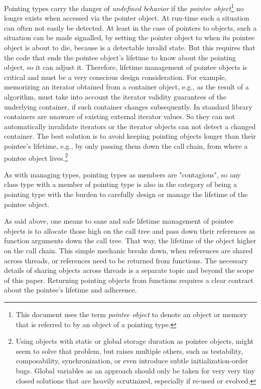 \documentclass[ebook,11pt,article]{memoir}
\begin{document}
Pointing types carry the danger of \emph{undefined behavior} if the \emph{pointee object}\footnote{This document uses the term \emph{pointee object} to denote an object or memory that is referred to by an object of a pointing type.} no longer exists when accessed via the pointer object. At run-time such a situation can often not easily be detected. At least in the case of pointers to objects, such a situation can be made signalled, by setting the pointer object to  when its pointee object is about to die, because  is a detectable invalid state. But this requires that the code that ends the pointee object's lifetime to know about the pointing object, so it can adjust it. Therefore, lifetime management of pointee objects is critical and must be a very conscious design consideration. For example, memorizing an iterator obtained from a container object, e.g., as the result of a  algorithm, must take into account the iterator validity guarantees of the underlying container, if such container changes subsequently. In \Cpp{} standard library containers are unaware of existing external iterator values. So they can not automatically invalidate iterators or the iterator objects can not detect a changed container. The best solution is to avoid keeping pointing objects longer than their pointee's lifetime, e.g., by only passing them down the call chain, from where a pointee object lives.\footnote{Using objects with static or global storage duration as pointee objects, might seem to solve that problem, but raises multiple others, such as testability, composability, synchronization, or even introduce subtle initialization-order bugs. Global variables as an approach should only be taken for very very tiny closed solutions that are heavily scrutinized, especially if re-used or evolved.}

As with managing types, pointing types as members are "contagious", so any class type with a member of pointing type is also in the category of being a pointing type with the burden to carefully design or manage the lifetime of the pointee object.

As said above, one means to sane and safe lifetime management of pointee objects is to allocate those high on the call tree and pass down their references as function arguments down the call tree. That way, the lifetime of the object higher on the call chain. This simple mechanic breaks down, when references are shared across threads, or references need to be returned from functions. The necessary details of sharing objects across threads is a separate topic and beyond the scope of this paper. Returning pointing objects from functions requires a clear contract about the pointee's lifetime and adherence. 
\end{document}
